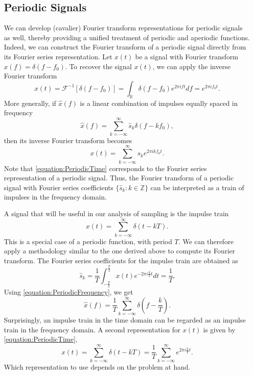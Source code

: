 \subsection{Periodic Signals}
\label{section:PeriodicSignals}

We can develop (cavalier) Fourier transform representations for periodic signals as well, thereby providing a unified treatment of periodic and aperiodic functions. 
Indeed, we can construct the Fourier transform of a periodic signal directly from its Fourier series representation.
Let $x(t)$ be a signal with Fourier transform $\hat{x}(f) = \delta (f - f_0)$.
To recover the signal $x(t)$, we can apply the inverse Fourier transform
\begin{equation*}
x(t) = \mathcal{F}^{-1} [ \delta (f - f_0) ]
=\int_{\mathbb{R}} \delta (f - f_0) e^{2 \pi i f t} df
= e^{2 \pi i f_0 t}.
\end{equation*}
More generally, if $\hat{x}(f)$ is a linear combination of impulses equally spaced in frequency
\begin{equation} \label{equation:PeriodicFrequency}
\hat{x}(f) = \sum_{k = -\infty}^{\infty} \hat{s}_k \delta (f - k f_0) ,
\end{equation}
then its inverse Fourier transform becomes
\begin{equation} \label{equation:PeriodicTime}
x(t) = \sum_{k = -\infty}^{\infty} \hat{s}_k e^{2 \pi i k f_0 t} .
\end{equation}
Note that \eqref{equation:PeriodicTime} corresponds to the Fourier series representation of a periodic signal.
Thus, the Fourier transform of a periodic signal with Fourier series coefficients $\{ \hat{s}_k : k \in \mathbb{Z} \}$ can be interpreted as a train of impulses in the frequency domain.

A signal that will be useful in our analysis of sampling is the impulse train
\begin{equation*}
x(t) = \sum_{k = -\infty}^{\infty} \delta(t - kT) .
\end{equation*}
This is a special case of a periodic function, with period $T$.
We can therefore apply a methodology similar to the one derived above to compute its Fourier transform.
The Fourier series coefficients for the impulse train are obtained as
\begin{equation*}
\hat{s}_k = \frac{1}{T} \int_{-\frac{T}{2}}^{\frac{T}{2}}
x(t) e^{- 2 \pi i \frac{k}{T} t} dt
= \frac{1}{T} .
\end{equation*}
Using \eqref{equation:PeriodicFrequency}, we get
\begin{equation} \label{equation:ImpulseTrainFrequency}
\hat{x}(f)
= \frac{1}{T} \sum_{k = -\infty}^{\infty} \delta \left( f - \frac{k}{T} \right) .
\end{equation}
Surprisingly, an impulse train in the time domain can be regarded as an impulse train in the frequency domain.
A second representation for $x(t)$ is given by \eqref{equation:PeriodicTime},
\begin{equation} \label{equation:ImpulseTrainTime}
x(t) = \sum_{k = -\infty}^{\infty} \delta(t - kT)
= \frac{1}{T} \sum_{k = -\infty}^{\infty} e^{2 \pi i \frac{k}{T} t} .
\end{equation}
Which representation to use depends on the problem at hand.


